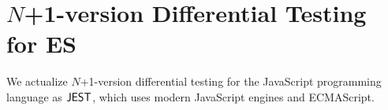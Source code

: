 \section{$N$+1-version Differential Testing for ES}
\label{sec:application}
We actualize $N$+1-version differential testing for the JavaScript programming
language as $\text{\sf JEST}$, which uses modern JavaScript engines and ECMAScript.






